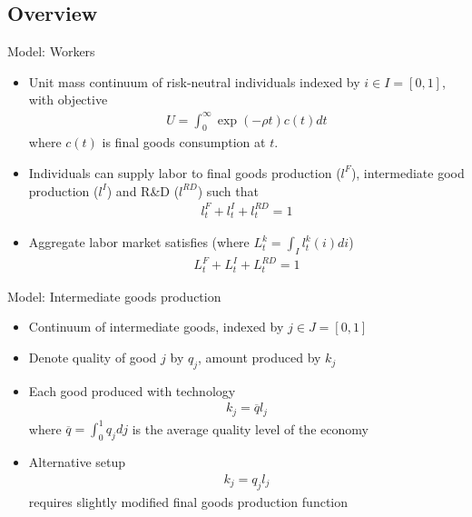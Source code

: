 \documentclass[english,usenames,dvipsnames]{beamer}
\begin{document}
\subsection{Overview}
\begin{frame}{Model: Workers}
\begin{itemize}
	\item Unit mass continuum of risk-neutral individuals indexed by $i\in I =[0,1]$, with objective
	\begin{align*}
		U = \int_0^{\infty}\exp(-\rho t)c(t)dt
	\end{align*}
	where $c(t)$ is final goods consumption at $t$.
	\item Individuals can supply labor to final goods production ($l^F$), intermediate good production ($l^I$) and R\&D ($l^{RD}$) such that 
	\begin{align*}
		l_t^F+ l_t^I + l_t^{RD} = 1
	\end{align*}
	\item Aggregate labor market satisfies (where $L_t^k = \int_I l_t^k(i)di$)
	\begin{align*}
		L_t^F + L_t^I + L_t^{RD} = 1
	\end{align*}
\end{itemize}
\end{frame}

\begin{frame}{Model: Intermediate goods production}
\begin{itemize}
	\item Continuum of intermediate goods, indexed by $j\in J = [0,1]$
	\item Denote quality of good $j$ by $q_j$, amount produced by $k_j$
	\item Each good produced with technology 
	\begin{align*}
	k_j = \overline{q} l_j
	\end{align*}
	where $\overline{q} = \int_0^1 q_j dj$ is the average quality level of the economy
	\item Alternative setup 
	\begin{align*}
	k_j = q_j l_j
	\end{align*} 
	requires slightly modified final goods production function
	
\end{itemize}
\end{frame}
\end{document}
